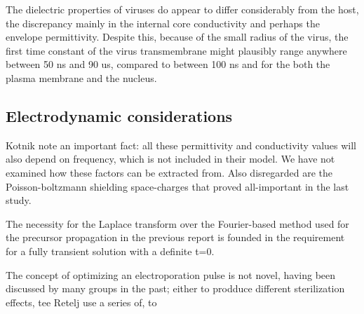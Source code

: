 \documentclass[fleqn,10pt]{paper}
\begin{document}

The dielectric properties of viruses do appear to differ considerably from the host, the discrepancy mainly in the internal core conductivity and perhaps the envelope permittivity. Despite this, because of the small radius of the virus, the first time constant of the virus transmembrane might plausibly range anywhere between 50 ns and 90 us, compared to between 100 ns and  for the both the plasma membrane and the nucleus.



\subsection*{Electrodynamic considerations}

Kotnik note an important fact: all these permittivity and conductivity values will also depend on frequency, which is not included in their model. We have not examined how these factors can be extracted from. Also disregarded are the Poisson-boltzmann shielding space-charges that proved all-important in the last study. 

The necessity for the Laplace transform over the Fourier-based method used for the precursor propagation in the previous report is founded in the requirement for a fully transient solution with a definite t=0.

The concept of optimizing an electroporation pulse is not novel, having been discussed by many groups in the past; either to prodduce different sterilization effects, tee Retelj use a series of, to 
\end{document}
